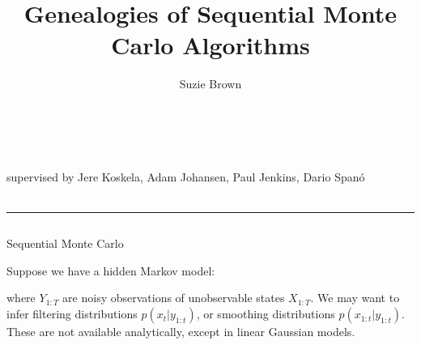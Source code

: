 \documentclass[final, 12pt]{beamer}
\title{Genealogies of Sequential Monte Carlo Algorithms}
\author{Suzie Brown}
\institute{Department of Statistics, University of Warwick}
\date{}
\newlength{\colwidth}
\begin{document}
\begin{frame}

\vspace*{-35pt}

\centering
{}

\vspace*{-160pt}

\huge{\inserttitle}\\[10pt]
\Large{\insertauthor}\\[7pt]
\normalsize{supervised by Jere Koskela, Adam Johansen, Paul Jenkins, Dario Span\'o}\\[7pt]
\normalsize{\insertinstitute}\\[35pt]
\hrule

\vspace*{15pt}

\begin{columns}
\begin{column}{\colwidth}
\begin{block}{Sequential Monte Carlo}

Suppose we have a hidden Markov model:

\begin{center}
\end{center}
\vspace*{-20pt}

where $Y_{1:T}$ are noisy observations of unobservable states $X_{1:T}$.
We may want to infer filtering distributions $p(x_t | y_{1:t})$, or smoothing distributions $p(x_{1:t} | y_{1:t})$. 
These are not available analytically, except in linear Gaussian models. \\[12pt]


\end{block}
\end{column}
\end{columns}
\end{frame}
\end{document}
